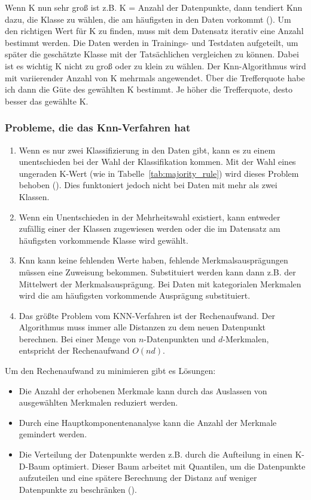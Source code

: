 \documentclass[envcountsame, envcountchap, deutsch]{i-studis}
\begin{document}
Wenn K nun sehr groß ist z.B. K = Anzahl der Datenpunkte, dann tendiert Knn dazu, die Klasse zu wählen, die am häufigsten in den Daten vorkommt (\cite{Lavrenko_Sutton_2011_knn}). 
Um den richtigen Wert für K zu finden, muss mit dem Datensatz iterativ eine Anzahl bestimmt werden. Die Daten werden in Trainings- und Testdaten 
aufgeteilt, um später die geschätzte Klasse mit der Tatsächlichen vergleichen zu können. Dabei ist es wichtig K nicht zu groß oder zu klein zu wählen. 
Der Knn-Algorithmus wird mit variierender Anzahl von K mehrmals angewendet. Über die Trefferquote habe ich dann die Güte des gewählten K bestimmt. 
Je höher die Trefferquote, desto besser das gewählte K.
\subsubsection{Probleme, die das Knn-Verfahren hat}
\begin{enumerate}
    \item Wenn es nur zwei Klassifizierung in den Daten gibt, kann es zu einem unentschieden bei der Wahl der Klassifikation kommen. Mit der Wahl eines ungeraden K-Wert (wie in Tabelle~\ref{tab:majority_rule}) wird dieses Problem behoben (\cite[p.4]{Lavrenko_Sutton_2011_knn}). Dies funktoniert jedoch nicht bei Daten mit mehr als zwei Klassen.
    \item Wenn ein Unentschieden in der Mehrheitswahl existiert, kann entweder zufällig einer der Klassen zugewiesen werden oder die im Datensatz am häufigsten vorkommende Klasse wird gewählt.
    \item Knn kann keine fehlenden Werte haben, fehlende Merkmalsausprägungen müs\-sen eine Zuweisung bekommen. Substituiert werden kann dann z.B. der Mittelwert der Merkmalsausprägung. Bei Daten mit kategorialen Merkmalen wird die am häufigsten vorkommende Ausprägung substituiert.
    \item Das größte Problem vom KNN-Verfahren ist der Rechenaufwand. Der Algorithmus muss immer alle Distanzen zu dem neuen Datenpunkt berechnen. Bei einer Menge von $n$-Datenpunkten und $d$-Merkmalen, entspricht der Rechenaufwand $O(nd)$.
\end{enumerate}

Um den Rechenaufwand zu minimieren gibt es Lösungen: 

\begin{itemize}
    \item Die Anzahl der erhobenen Merkmale kann durch das Auslassen von ausgewählten Merkmalen reduziert werden.
    \item Durch eine Hauptkomponentenanalyse kann die Anzahl der Merkmale gemindert werden.
    \item Die Verteilung der Datenpunkte werden z.B. durch die Aufteilung in einen K-D-Baum optimiert. Dieser Baum arbeitet mit Quantilen, um die Datenpunkte aufzuteilen und eine spätere Berechnung der Distanz auf weniger Datenpunkte zu beschränken (\cite{Lavrenko_Sutton_2011_knn}).
\end{itemize}
\end{document}
